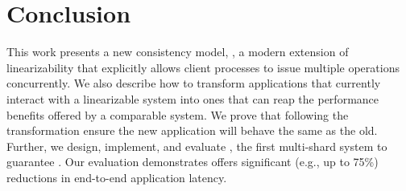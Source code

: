 \section{Conclusion}
\label{sec:concl}

This work presents a new consistency model, \mdllong{}, a
modern extension of linearizability that explicitly allows
client processes to issue multiple operations concurrently.
We also describe how
to transform applications that currently interact with 
a linearizable system into ones that can reap the performance
benefits offered by a comparable \mdl{} system. We prove that
following the transformation ensure the new application will 
behave the same as the old. Further, we design, implement,
and evaluate \sys{}, the first
multi-shard system to guarantee \mdl{}. Our evaluation 
demonstrates \sys{} offers significant (e.g., up to 75\%) 
reductions in end-to-end application latency.
